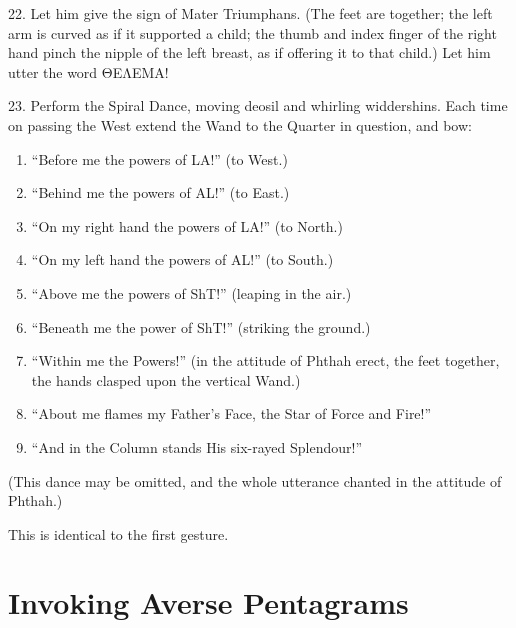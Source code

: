 22. Let him give the sign of Mater Triumphans. (The feet are together; the left arm is curved as if it supported a child; the thumb and index finger of the right hand pinch the nipple of the left breast, as if offering it to that child.) Let him utter the word \textgreek{ΘΕΛΕΜΑ}!

23. Perform the Spiral Dance, moving deosil and whirling widdershins. Each time on passing the West extend the Wand to the Quarter in question, and bow:

\begin{enumerate}[label=\alph*.]
\item \enquote{Before me the powers of LA!} (to West.)
\item \enquote{Behind me the powers of AL!} (to East.)
\item \enquote{On my right hand the powers of LA!} (to North.)
\item \enquote{On my left hand the powers of AL!} (to South.)
\item \enquote{Above me the powers of ShT!} (leaping in the air.)
\item \enquote{Beneath me the power of ShT!} (striking the ground.)
\item \enquote{Within me the Powers!} (in the attitude of Phthah erect, the feet together, the hands clasped upon the vertical Wand.)
\item \enquote{About me flames my Father's Face, the Star of Force and Fire!}
\item \enquote{And in the Column stands His six-rayed Splendour!}
\end{enumerate}

(This dance may be omitted, and the whole utterance chanted in the attitude of Phthah.)


This is identical to the first gesture.

\section*{Invoking Averse Pentagrams}

\begin{center}
\end{center}

